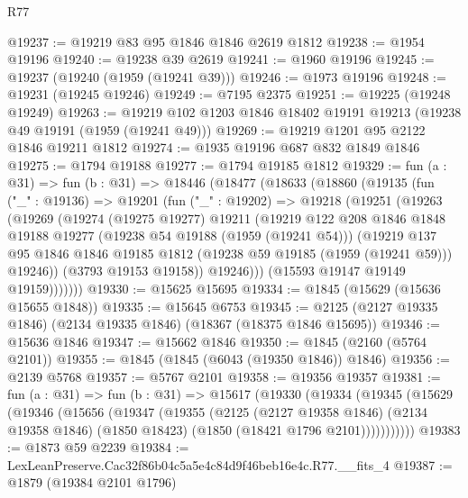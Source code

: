 \begin{lexlean}{R77}
\begin{coremodule}
@19237 := @19219 @83 @95 @1846 @1846 @2619 @1812
@19238 := @1954 @19196
@19240 := @19238 @39 @2619
@19241 := @1960 @19196
@19245 := @19237 (@19240 (@1959 (@19241 @39)))
@19246 := @1973 @19196
@19248 := @19231 (@19245 @19246)
@19249 := @7195 @2375
@19251 := @19225 (@19248 @19249)
@19263 := @19219 @102 @1203 @1846 @18402 @19191 @19213 (@19238 @49 @19191 (@1959 (@19241 @49)))
@19269 := @19219 @1201 @95 @2122 @1846 @19211 @1812
@19274 := @1935 @19196 @687 @832 @1849 @1846
@19275 := @1794 @19188
@19277 := @1794 @19185 @1812
@19329 := fun (a : @31) =>
  fun (b : @31) =>
  @18446
    (@18477
      (@18633
        (@18860
          (@19135
            (fun ("_" : @19136) =>
            @19201
              (fun ("_" : @19202) =>
              @19218
                (@19251
                  (@19263
                    (@19269
                      (@19274
                        (@19275 @19277)
                        @19211
                        (@19219
                          @122
                          @208
                          @1846
                          @1848
                          @19188
                          @19277
                          (@19238 @54 @19188 (@1959 (@19241 @54)))
                          (@19219
                            @137
                            @95
                            @1846
                            @1846
                            @19185
                            @1812
                            (@19238 @59 @19185 (@1959 (@19241 @59)))
                            @19246))
                        (@3793 @19153 @19158))
                      @19246)))
                (@15593 @19147 @19149 @19159)))))))
@19330 := @15625 @15695
@19334 := @1845 (@15629 (@15636 @15655 @1848))
@19335 := @15645 @6753
@19345 := @2125 (@2127 @19335 @1846) (@2134 @19335 @1846) (@18367 (@18375 @1846 @15695))
@19346 := @15636 @1846
@19347 := @15662 @1846
@19350 := @1845 (@2160 (@5764 @2101))
@19355 := @1845 (@1845 (@6043 (@19350 @1846)) @1846)
@19356 := @2139 @5768
@19357 := @5767 @2101
@19358 := @19356 @19357
@19381 := fun (a : @31) =>
  fun (b : @31) =>
  @15617
    (@19330
      (@19334
        (@19345
          (@15629
            (@19346
              (@15656
                (@19347
                  (@19355
                    (@2125
                      (@2127 @19358 @1846)
                      (@2134 @19358 @1846)
                      (@1850 @18423)
                      (@1850 (@18421 @1796 @2101)))))))))))
@19383 := @1873 @59 @2239
@19384 := LexLeanPreserve.Cac32f86b04c5a5e4c84d9f46beb16e4c.R77.__fits_4
@19387 := @1879 (@19384 @2101 @1796)

\end{coremodule}
\end{lexlean}
